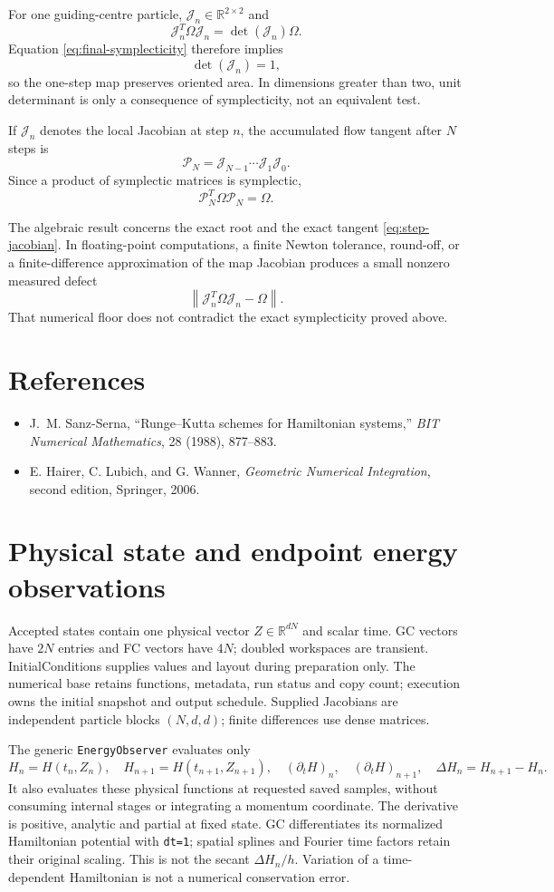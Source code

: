 \documentclass[11pt,a4paper]{article}
\newcommand{\R}{\mathbb{R}}
\newcommand{\Om}{\Omega}
\newcommand{\Jn}{\mathcal{J}_n}
\begin{document}
For one guiding-centre particle, $\Jn\in\R^{2\times2}$ and
\[
 \Jn^T\Om\Jn=\det(\Jn)\Om.
\]
Equation \eqref{eq:final-symplecticity} therefore implies
\[
 \det(\Jn)=1,
\]
so the one-step map preserves oriented area.  In dimensions greater than two,
unit determinant is only a consequence of symplecticity, not an equivalent
test.

If $\Jn$ denotes the local Jacobian at step $n$, the accumulated flow tangent
after $N$ steps is
\[
 \mathcal{P}_N=\mathcal{J}_{N-1}\cdots\mathcal{J}_1\mathcal{J}_0.
\]
Since a product of symplectic matrices is symplectic,
\[
 \mathcal{P}_N^T\Om\mathcal{P}_N=\Om.
\]

The algebraic result concerns the exact root and the exact tangent
\eqref{eq:step-jacobian}.  In floating-point computations, a finite Newton
tolerance, round-off, or a finite-difference approximation of the map
Jacobian produces a small nonzero measured defect
\[
 \left\lVert\Jn^T\Om\Jn-\Om\right\rVert.
\]
That numerical floor does not contradict the exact symplecticity proved above.

\section*{References}

\begin{itemize}
 \item J.~M. Sanz-Serna, ``Runge--Kutta schemes for Hamiltonian systems,''
       \emph{BIT Numerical Mathematics}, 28 (1988), 877--883.
 \item E. Hairer, C. Lubich, and G. Wanner,
       \emph{Geometric Numerical Integration}, second edition,
       Springer, 2006.
\end{itemize}

\clearpage
\section{Physical state and endpoint energy observations}
Accepted states contain one physical vector $Z\in\mathbb{R}^{dN}$ and scalar time.
GC vectors have $2N$ entries and FC vectors have $4N$; doubled workspaces are
transient. InitialConditions supplies values and layout during preparation only.
The numerical base retains functions, metadata, run status and copy count;
execution owns the initial snapshot and output schedule. Supplied Jacobians are
independent particle blocks $(N,d,d)$; finite differences use dense matrices.

The generic \texttt{EnergyObserver} evaluates only
\[
 H_n=H(t_n,Z_n),\quad H_{n+1}=H(t_{n+1},Z_{n+1}),\quad
 (\partial_tH)_n,\quad (\partial_tH)_{n+1},\quad
 \Delta H_n=H_{n+1}-H_n.
\]
It also evaluates these physical functions at requested saved samples, without
consuming internal stages or integrating a momentum coordinate. The derivative
is positive, analytic and partial at fixed state. GC differentiates its normalized
Hamiltonian potential with \texttt{dt=1}; spatial splines and Fourier time factors
retain their original scaling. This is not the secant $\Delta H_n/h$.
Variation of a time-dependent Hamiltonian is not a numerical conservation error.
\end{document}
